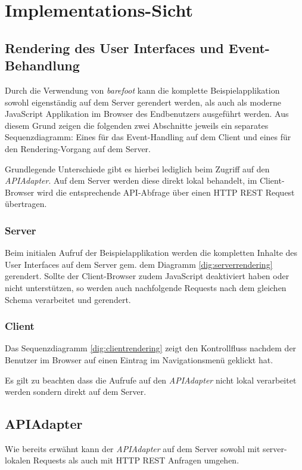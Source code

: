 \section{Implementations-Sicht}


\subsection{Rendering des User Interfaces und Event-Behandlung}
Durch die Verwendung von \emph{barefoot} \cite{Barefoot} kann die komplette Beispielapplikation sowohl eigenständig auf dem Server gerendert werden, als auch als moderne JavaScript Applikation im Browser des Endbenutzers ausgeführt werden. Aus diesem Grund zeigen die folgenden zwei Abschnitte jeweils ein separates Sequenzdiagramm: Eines für das Event-Handling auf dem Client und eines für den Rendering-Vorgang auf dem Server.

Grundlegende Unterschiede gibt es hierbei lediglich beim Zugriff auf den \emph{APIAdapter}. Auf dem Server werden diese direkt lokal behandelt, im Client-Browser wird die entsprechende API-Abfrage über einen HTTP REST Request übertragen.

\subsubsection*{Server}
Beim initialen Aufruf der Beispielapplikation werden die kompletten Inhalte des User Interfaces auf dem Server gem. dem Diagramm \ref{dig:serverrendering} gerendert. Sollte der Client-Browser zudem JavaScript deaktiviert haben oder nicht unterstützen, so werden auch nachfolgende Requests nach dem gleichen Schema verarbeitet und gerendert.



\subsubsection*{Client}
Das Sequenzdiagramm \ref{dig:clientrendering} zeigt den Kontrollfluss nachdem der Benutzer im Browser auf einen Eintrag im Navigationsmenü geklickt hat.

Es gilt zu beachten dass die Aufrufe auf den \emph{APIAdapter} nicht lokal verarbeitet werden sondern direkt auf dem Server.




\subsection{APIAdapter}
Wie bereits erwähnt kann der \emph{APIAdapter} auf dem Server sowohl mit server-lokalen Requests als auch mit HTTP REST Anfragen umgehen.

